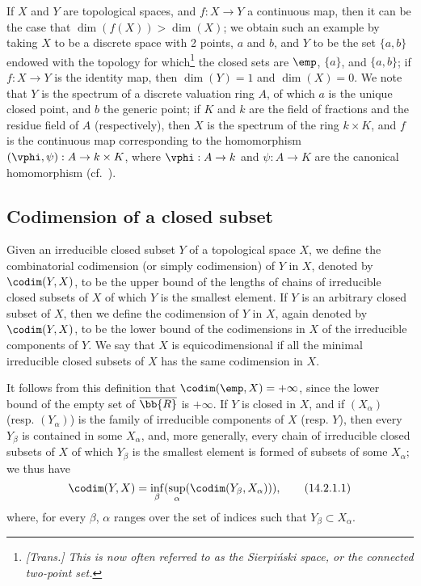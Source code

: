 \begin{rmk}[14.1.12]
\label{0.14.1.12}
If $X$ and $Y$ are topological spaces, and $f:X\to Y$ a continuous map, then it can be the case that $\dim(f(X))>\dim(X)$;
we obtain such an example by taking $X$ to be a discrete space with 2 points, $a$ and $b$, and $Y$ to be the set $\{a,b\}$ endowed with the topology for which\footnote{\emph{[Trans.] This is now often referred to as the \emph{Sierpiński space}, or the \emph{connected two-point set}.}} the closed sets are $\emp$, $\{a\}$, and $\{a,b\}$;
if $f:X\to Y$ is the identity map, then $\dim(Y)=1$ and $\dim(X)=0$.
We note that $Y$ is the spectrum of a discrete valuation ring $A$, of which $a$ is the unique closed point, and $b$ the generic point;
if $K$ and $k$ are the field of fractions and the residue field of $A$ (respectively), then $X$ is the spectrum of the ring $k\times K$, and $f$ is the continuous map corresponding to the homomorphism $(\vphi,\psi):A\to k\times K$, where $\vphi:A\to k$ and $\psi:A\to K$ are the canonical homomorphism (cf.~).
\end{rmk}

\subsection{Codimension of a closed subset}
\label{subsection:codimension-of-a-closed-subset}

\begin{defn}[14.2.1]
\label{0.14.2.1}
Given an irreducible closed subset $Y$ of a topological space $X$, we define the combinatorial codimension (or simply codimension) of $Y$ in $X$, denoted by $\codim(Y,X)$, to be the upper bound of the lengths of chains of irreducible closed subsets of $X$ of which $Y$ is the smallest element.
If $Y$ is an arbitrary closed subset of $X$, then we define the codimension of $Y$ in $X$, again denoted by $\codim(Y,X)$, to be the lower bound of the codimensions in $X$ of the irreducible components of $Y$.
We say that $X$ is equicodimensional if all the minimal irreducible closed subsets of $X$ has the same codimension in $X$.
\end{defn}

It follows from this definition that $\codim(\emp,X)=+\infty$, since the lower bound of the empty set of $\overline{\bb{R}}$ is $+\infty$.
If $Y$ is closed in $X$, and if $(X_\alpha)$ (resp. $(Y_\alpha)$) is the family of irreducible components of $X$ (resp. $Y$), then every $Y_\beta$ is contained in some $X_\alpha$, and, more generally, every chain of irreducible closed subsets of $X$ of which $Y_\beta$ is the smallest element is formed of subsets of some $X_\alpha$;
we thus have
\[
\label{0.14.2.1.1}
  \codim(Y,X)=\inf_\beta(\sup_\alpha(\codim(Y_\beta,X_\alpha))),
  \tag{14.2.1.1}
\]
where, for every $\beta$, $\alpha$ ranges over the set of indices such that $Y_\beta\subset X_\alpha$.

